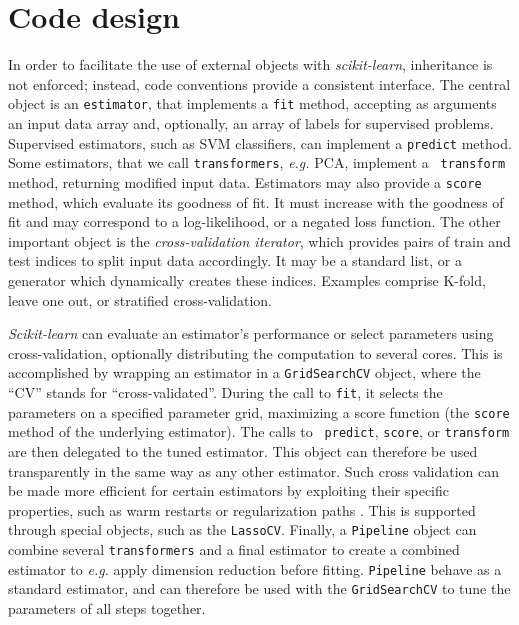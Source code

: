 \documentclass[twoside,11pt]{article}
\begin{document}

\section{Code design}

%
In order to facilitate the use of external objects with \emph{scikit-learn},
inheritance is not enforced; instead, code
conventions provide a consistent interface.
The central object is an {\tt estimator}, that implements a
{\tt fit} method, accepting as arguments an input data array and,
optionally, an array of labels for supervised problems. Supervised estimators,
such as SVM classifiers, can implement a {\tt predict} method. Some estimators,
that we call {\tt transformers}, \emph{e.g.} PCA, implement a {\tt
transform} method, returning modified input data.
%
Estimators may also provide a {\tt score} method, which evaluate its
goodness of fit. It must increase with the goodness of fit and
may correspond to a log-likelihood, or a negated loss function.
%
The other important object is the \emph{cross-validation iterator},
which provides pairs of train and test indices to split input
data accordingly. It may be a standard list, or a generator
which dynamically
creates these indices.
Examples comprise K-fold,
leave one out, or
stratified cross-validation.


\smallskip {}
%
\emph{Scikit-learn} can evaluate an estimator's performance or select
parameters using cross-validation, optionally distributing the
computation to several cores.
This is accomplished by wrapping an estimator in a {\tt GridSearchCV}
object, where the ``CV'' stands for ``cross-validated''.
During the call to {\tt fit}, it selects the parameters
on a specified parameter grid, maximizing a score function
(the {\tt score} method of the underlying estimator). The calls to {\tt
predict}, {\tt score}, or {\tt transform} are then delegated to the tuned
estimator. This object can therefore be used transparently in the same
way as any other
estimator.
Such cross validation can be made more efficient for certain
estimators by exploiting their specific properties, such as warm restarts
or regularization paths \citep{friedman2010}. This is supported through special
objects, such as the {\tt LassoCV}.
%
Finally, a {\tt Pipeline} object can
combine several {\tt transformers} and a final estimator to create a
combined estimator to \emph{e.g.} apply dimension reduction before
fitting. {\tt Pipeline} behave as a standard estimator, and can
therefore be used
with the {\tt GridSearchCV} to tune the parameters of all steps together.
\end{document}
